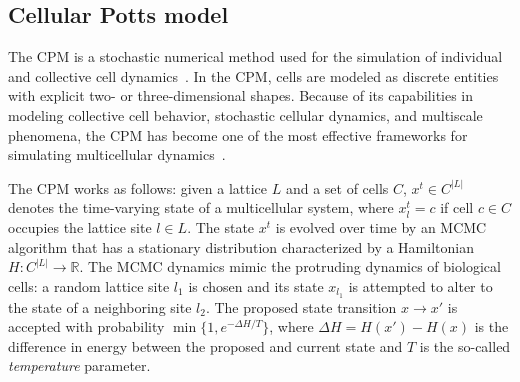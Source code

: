 \subsection{Cellular Potts model}\label{sec:cp-model}

The CPM is a stochastic numerical method used for the simulation of individual and collective cell dynamics~\cite{Graner1992, Savill1997, Balter2007}. In the CPM, cells are modeled as discrete entities with explicit two- or three-dimensional shapes. Because of its capabilities in modeling collective cell behavior, stochastic cellular dynamics, and multiscale phenomena, the CPM has become one of the most effective frameworks for simulating multicellular dynamics~\cite{Rens2019, Hirashima2017}.

The CPM works as follows: given a lattice $L$ and a set of cells $C$, $x^t \in C^{|L|}$ denotes the time-varying state of a multicellular system, where $x^t_l = c$ if cell $c \in C$ occupies the lattice site $l \in L$. 
The state $x^t$ is evolved over time by an MCMC algorithm that has a stationary distribution characterized by a Hamiltonian $H: C^{|L|} \rightarrow \mathbb{R}$. The MCMC dynamics mimic the protruding dynamics of biological cells: 
a random lattice site $l_1$ is chosen and its state $x_{l_1}$ is attempted to alter to the state of a neighboring site $l_2$. The proposed state transition $x \to x'$ is accepted 
with probability $\min\{1, e^{-\Delta H / T}\}$, where $\Delta H = H(x') - H(x)$ is the difference in energy between the proposed and current state and $T$ is the so-called \emph{temperature} parameter. 

